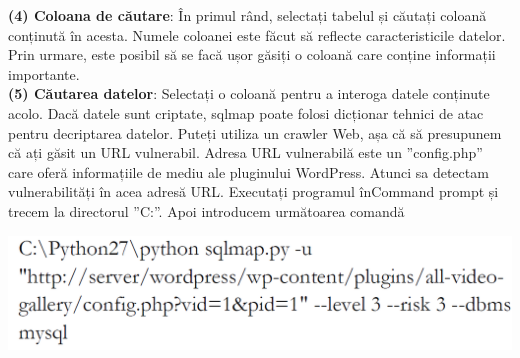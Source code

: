 \documentclass[oneside,20pt]{article}          %
\begin{document}
\textbf{(4) Coloana de căutare}: În primul rând, selectați tabelul și căutați
coloană conținută în acesta. Numele coloanei este făcut să reflecte
caracteristicile datelor. Prin urmare, este posibil să se facă ușor
găsiți o coloană care conține informații importante.\\
\textbf{(5) Căutarea datelor}: Selectați o coloană pentru a interoga datele conținute
acolo. Dacă datele sunt criptate, sqlmap poate folosi dicționar
tehnici de atac pentru decriptarea datelor.
Puteți utiliza un crawler Web, așa că să presupunem că ați găsit un
URL vulnerabil. Adresa URL vulnerabilă este un ”config.php” care oferă
informațiile de mediu ale pluginului WordPress. Atunci sa
detectam vulnerabilități în acea adresă URL. Executați programul înCommand prompt și trecem la directorul ”C:\sqlmap”. Apoi introducem următoarea comandă
\begin{center}
\includegraphics[height = 1 cm]{8.png}
\end{center}
\end{document}
